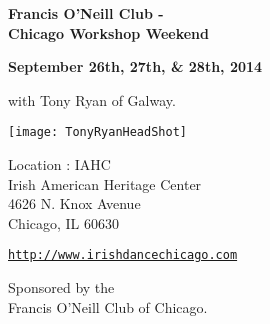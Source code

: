 \begin{center}
{\Large\textbf{Francis O'Neill Club - \\ Chicago Workshop Weekend}}\\ 
\end{center}

\begin{center}
\textbf{September 26th, 27th, \&  28th, 2014} 


\vspace*{0.25em}
with Tony Ryan of Galway.
\end{center}

\vspace*{0.45em}
\begin{center}
\texttt{[image: TonyRyanHeadShot]}
\end{center}

\vspace*{2.5em}
Location : IAHC\\
Irish American Heritage Center\\
4626 N. Knox Avenue\\
Chicago, IL  60630 

\begin{center}
\vspace*{2em}
\href{http://www.irishdancechicago.com}{\tt http://www.irishdancechicago.com} 

{\small Sponsored by the \\Francis O'Neill Club of Chicago.}
\end{center}
